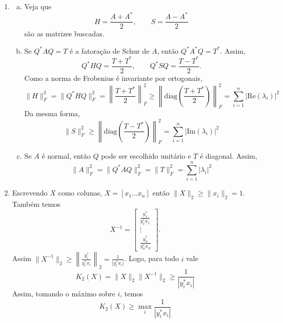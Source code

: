 \documentclass[a4paper,12pt]{article}
\newcommand{\vecea}{\begin{pmatrix} 1 & \frac{c}{a-b} \end{pmatrix}}
\newcommand{\vecda}{\begin{pmatrix} 1 \\ 0 \end{pmatrix}}
\newcommand{\veceb}{\begin{pmatrix} 0 & 1 \end{pmatrix}}
\begin{document}



\begin{enumerate}
    \item[\textcircled{7}] 
    \begin{enumerate}[(a)]
        \item Veja que  $$H = \frac{A+A^*}{2}, \qquad S = \frac{A-A^*}{2}$$
        são as matrizes buscadas.
        \item Se $Q^*AQ = T$ é a fatoração de Schur de $A$, então $Q^*A^*Q = T^*$.
        Assim,
    $$Q^*HQ = \frac{T+T^*}{2}, \qquad Q^*SQ = \frac{T-T^*}{2}.$$
    Como a norma de Frobenius é invariante por ortogonais,
    \[
    \|H\|_F^2 = \|Q^*HQ\|_F^2 = \left\|\frac{T+T^*}{2}\right\|_F^2 \ge \left\|\text{diag}(\frac{T+T^*}{2})\right\|_F^2 = \sum_{i=1}^{n} |\text{Re}(\lambda_i)|^2
    \]
    Da mesma forma,
    \[
    \|S\|_F^2 \ge \left\|\text{diag}(\frac{T-T^*}{2})\right\|_F^2 = \sum_{i=1}^{n} |\text{Im}(\lambda_i)|^2
    \]
    \item Se $A$ é normal, então $Q$ pode ser escolhido unitário e $T$ é diagonal.
    Assim,
    \[
    \|A\|_F^2 = \|Q^*AQ\|_F^2 = \|T\|_F^2 = \sum_{i=1}^{n} |\lambda_i|^2
    \]
    \end{enumerate}
 

    \item[\textcircled{8}] Escrevendo $X$ como colunas, $X = [x_1 \dots x_n]$ então $\|X\|_2 \ge \|x_i\|_2 = 1$.
    Também temos 
    $$X^{-1} = \begin{bmatrix} \frac{y_1^*}{y_1^*x_1} \\ \vdots \\ \frac{y_n^*}{y_n^*x_n}\end{bmatrix}.$$
     Assim $\|X^{-1}\|_2 \ge \left\|\frac{y_i^*}{y_i^*x_i}\right\|_2 = \frac{1}{|y_i^*x_i|}$.
    Logo, para todo $i$ vale
    \[
    K_2(X) = \|X\|_2 \|X^{-1}\|_2 \ge \frac{1}{|y_i^*x_i|}
    \]
    Assim, tomando o máximo sobre $i$, temos
    \[
    K_2(X) \ge \max_i \frac{1}{|y_i^*x_i|}
    \]
\end{enumerate}
\end{document}
